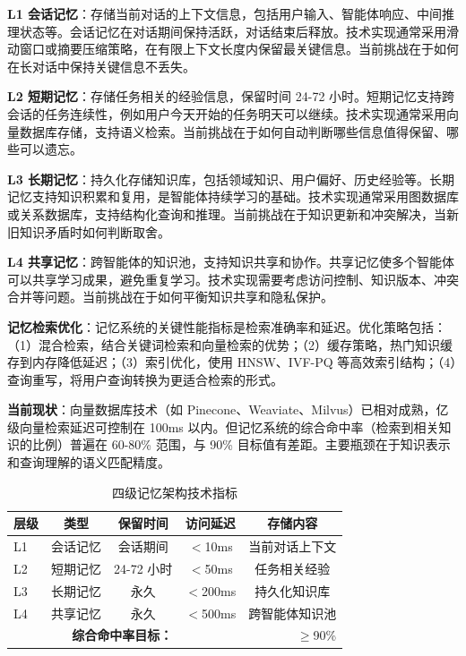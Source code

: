 \documentclass[12pt,a4paper]{article}
\begin{document}
\textbf{L1 会话记忆}：存储当前对话的上下文信息，包括用户输入、智能体响应、中间推理状态等。会话记忆在对话期间保持活跃，对话结束后释放。技术实现通常采用滑动窗口或摘要压缩策略，在有限上下文长度内保留最关键信息。当前挑战在于如何在长对话中保持关键信息不丢失。

\textbf{L2 短期记忆}：存储任务相关的经验信息，保留时间 24-72 小时。短期记忆支持跨会话的任务连续性，例如用户今天开始的任务明天可以继续。技术实现通常采用向量数据库存储，支持语义检索。当前挑战在于如何自动判断哪些信息值得保留、哪些可以遗忘。

\textbf{L3 长期记忆}：持久化存储知识库，包括领域知识、用户偏好、历史经验等。长期记忆支持知识积累和复用，是智能体持续学习的基础。技术实现通常采用图数据库或关系数据库，支持结构化查询和推理。当前挑战在于知识更新和冲突解决，当新旧知识矛盾时如何判断取舍。

\textbf{L4 共享记忆}：跨智能体的知识池，支持知识共享和协作。共享记忆使多个智能体可以共享学习成果，避免重复学习。技术实现需要考虑访问控制、知识版本、冲突合并等问题。当前挑战在于如何平衡知识共享和隐私保护。

\textbf{记忆检索优化}：记忆系统的关键性能指标是检索准确率和延迟。优化策略包括：（1）混合检索，结合关键词检索和向量检索的优势；（2）缓存策略，热门知识缓存到内存降低延迟；（3）索引优化，使用 HNSW、IVF-PQ 等高效索引结构；（4）查询重写，将用户查询转换为更适合检索的形式。

\textbf{当前现状}：向量数据库技术（如 Pinecone、Weaviate、Milvus）已相对成熟，亿级向量检索延迟可控制在 100ms 以内。但记忆系统的综合命中率（检索到相关知识的比例）普遍在 60-80\% 范围，与 90\% 目标值有差距。主要瓶颈在于知识表示和查询理解的语义匹配精度。

\begin{table}[h]
\centering
\caption{四级记忆架构技术指标}
\label{tab:memory}
\begin{tabular}{@{}lcccc@{}}
\toprule
\textbf{层级} & \textbf{类型} & \textbf{保留时间} & \textbf{访问延迟} & \textbf{存储内容} \\
\midrule
L1 & 会话记忆 & 会话期间 & $<$10ms & 当前对话上下文 \\
L2 & 短期记忆 & 24-72 小时 & $<$50ms & 任务相关经验 \\
L3 & 长期记忆 & 永久 & $<$200ms & 持久化知识库 \\
L4 & 共享记忆 & 永久 & $<$500ms & 跨智能体知识池 \\
\midrule
\multicolumn{3}{r}{\textbf{综合命中率目标：}} & \multicolumn{2}{r}{$\geq$90\%} \\
\bottomrule
\end{tabular}
\end{table}
\end{document}
